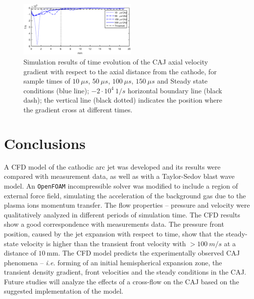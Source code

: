 \documentclass[a4paper]{iacas}%
\begin{document}
\begin{figure}
	\centering
	\includegraphics[width=0.52\textwidth]{CAJAcceleration.eps}
	\caption{Simulation results of time evolution of the CAJ axial velocity gradient with respect to the axial distance from the cathode, for sample times of $10~\mu s$, $50~\mu s$, $100~\mu s$, $150~\mu s$ and Steady state conditions (blue line); $-2\cdot 10^4~1/s$ horizontal boundary line (black dash); the vertical line (black dotted) indicates the position where the gradient cross at different times. }
	\label{fig:model_caj_acceleration}
\end{figure}
\section{Conclusions}
A CFD model of the cathodic arc jet was developed and its results were compared with measurement data, as well as with a Taylor-Sedov blast wave model.
An \texttt{OpenFOAM} incompressible solver was modified to include a region of external force field, simulating the acceleration of the background gas due to the plasma ions momentum transfer.
The flow properties -- pressure and velocity were qualitatively analyzed in different periods of simulation time. The CFD results show a good correspondence with measurements data. The pressure front position, caused by the jet expansion with respect to time, show that the steady-state velocity is higher than the transient front velocity with $> 100~m/s$ at a distance of $10~\mathrm{mm}$.
The CFD model predicts the experimentally observed CAJ phenomena -- \emph{i.e.} forming of an initial hemispherical expansion zone, the transient density gradient, front velocities and the steady conditions in the CAJ. Future studies will analyze the effects of a cross-flow on the CAJ based on the suggested implementation of the model.

\clearpage


\end{document}
